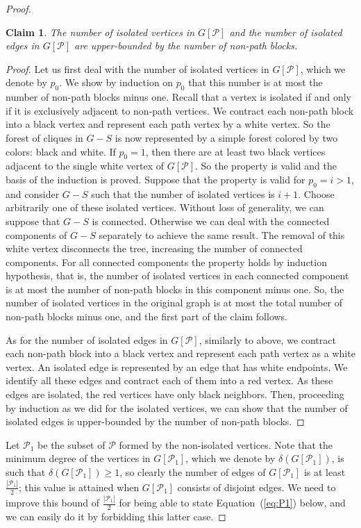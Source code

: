 \documentclass[
final
]{dmtcs-episciences}
\newtheorem{claimN}{Claim}{\bfseries}{\itshape}
\begin{document}
\begin{proof}
\begin{claimN}\label{lemma4.8}
The number of isolated vertices in $G[\mathcal{P}]$ and the number of isolated edges in $G[\mathcal{P}]$ are upper-bounded by the number of non-path blocks.	
	\end{claimN}
	\begin{proof}
	Let us first deal with the number of isolated vertices in $G[\mathcal{P}]$, which we denote by $p_0$. We show by induction on $p_0$ that this number is at most the number of non-path blocks minus one. Recall that a vertex is isolated if and only if it is exclusively adjacent to non-path vertices. We contract each non-path block into a  black vertex and represent each path vertex by a white vertex. So the forest of cliques in $G-S$ is now represented by a simple forest colored by two colors: black and white.
If $p_0=1$, then there are at least two black vertices adjacent to the single white vertex of $G[\mathcal{P}]$. So the property is valid and the basis of the induction is proved. Suppose that the property is valid for $p_0=i > 1$, and consider $G-S$ such that the number of isolated vertices is $i+1$. Choose arbitrarily one of these isolated vertices. Without loss of generality, we can suppose that $G-S$ is connected. Otherwise we can deal with the connected components of $G-S$ separately to achieve the same result. The removal of this white vertex disconnects the tree, increasing the number of connected components. For all connected components the property holds by induction hypothesis, that is, the number of isolated vertices in each connected component is at most the number of non-path blocks in this component minus one. So, the number of isolated vertices in the original graph is at most the total number of non-path blocks minus one, and the first part of the claim follows.

As for the number of isolated edges in $G[\mathcal{P}]$, similarly to above,  we contract each non-path block into a black vertex and represent each path vertex as a white vertex. An isolated edge is represented by an edge that has white endpoints. We identify all these edges and contract each of them into a red vertex. As these edges are isolated,  the red vertices have only black neighbors. Then, proceeding by induction as we did for the isolated vertices, we can show that the number of isolated edges is upper-bounded by the number of non-path blocks.
	\end{proof}



Let $\mathcal{P}_1$ be the subset of $\mathcal{P}$ formed by the non-isolated vertices. Note that the minimum degree of the vertices in $G[\mathcal{P}_1]$, which we denote by $\delta (G[\mathcal{P}_1])$, is such that $\delta (G[\mathcal{P}_1])\geq 1$, so clearly the number of edges of $G[\mathcal{P}_1]$ is at least $\frac{|\mathcal{P}_1|}{2}$; this value is attained when $G[\mathcal{P}_1]$ consists of disjoint edges. We need to improve this bound of $\frac{|\mathcal{P}_1|}{2}$ for being able to state Equation~(\ref{eq:P1}) below, and we can easily do it by forbidding this latter case.




\end{proof}
\end{document}

